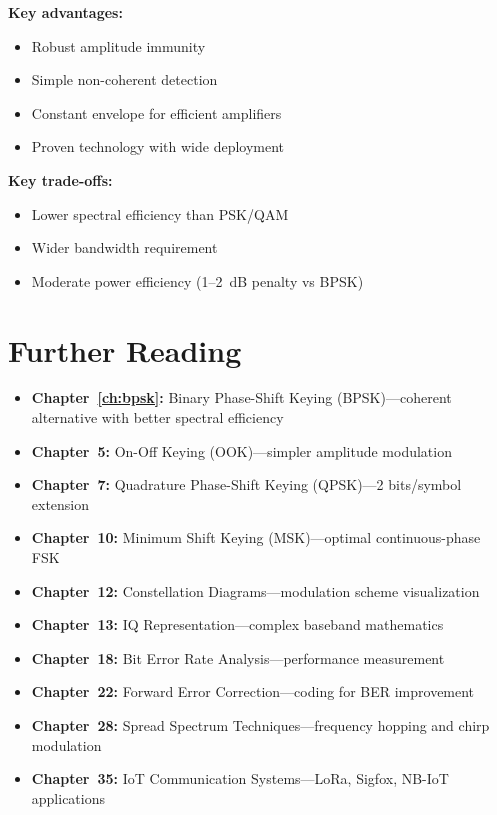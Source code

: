 \textbf{Key advantages:}
\begin{itemize}
\item Robust amplitude immunity
\item Simple non-coherent detection
\item Constant envelope for efficient amplifiers
\item Proven technology with wide deployment
\end{itemize}

\textbf{Key trade-offs:}
\begin{itemize}
\item Lower spectral efficiency than PSK/QAM
\item Wider bandwidth requirement
\item Moderate power efficiency (1--2~dB penalty vs BPSK)
\end{itemize}

\section{Further Reading}

\begin{itemize}
\item \textbf{Chapter~\ref{ch:bpsk}:} Binary Phase-Shift Keying (BPSK)---coherent alternative with better spectral efficiency
\item \textbf{Chapter~5:} On-Off Keying (OOK)---simpler amplitude modulation
\item \textbf{Chapter~7:} Quadrature Phase-Shift Keying (QPSK)---2 bits/symbol extension
\item \textbf{Chapter~10:} Minimum Shift Keying (MSK)---optimal continuous-phase FSK
\item \textbf{Chapter~12:} Constellation Diagrams---modulation scheme visualization
\item \textbf{Chapter~13:} IQ Representation---complex baseband mathematics
\item \textbf{Chapter~18:} Bit Error Rate Analysis---performance measurement
\item \textbf{Chapter~22:} Forward Error Correction---coding for BER improvement
\item \textbf{Chapter~28:} Spread Spectrum Techniques---frequency hopping and chirp modulation
\item \textbf{Chapter~35:} IoT Communication Systems---LoRa, Sigfox, NB-IoT applications
\end{itemize}
